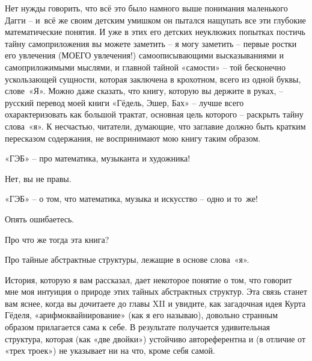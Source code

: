 \documentclass[../main.tex]{subfiles}
\begin{document}
Нет нужды говорить, что всё это было намного выше понимания маленького Дагги \--- и~всё же своим детским умишком он пытался нащупать все эти глубокие математические понятия. И уже в этих его детских неуклюжих попытках постичь тайну самоприложения вы можете заметить \--- я могу заметить \--- первые ростки его увлечения (МОЕГО увлечения!) самоописывающими высказываниями и самоприложимыми мыслями, и главной тайной «самости» \--- той бесконечно ускользающей сущности, которая заключена в крохотном, всего из одной буквы, слове~«Я». Можно даже сказать, что книгу, которую вы держите в руках, \--- русский перевод моей книги «Гёдель, Эшер, Бах» \--- лучше всего охарактеризовать как большой трактат, основная цель которого \--- раскрыть тайну слова~«я». К несчастью, читатели, думающие, что заглавие должно быть кратким пересказом содержания, не воспринимают мою книгу таким образом.

\begin{dialogue}
 «ГЭБ» \--- про математика, музыканта и художника!

 Нет, вы не правы.

 «ГЭБ» \--- о том, что математика, музыка и искусство \--- одно и то~же!

 Опять ошибаетесь.

 Про что же тогда эта книга?

 Про тайные абстрактные структуры, лежащие в основе слова~«я».
\end{dialogue}

История, которую я вам рассказал, дает некоторое понятие о том, что говорит мне моя интуиция о природе этих тайных абстрактных структур. Эта связь станет вам яснее, когда вы дочитаете до главы XII и увидите, как загадочная идея Курта Гёделя, «арифмоквайнирование» (как я его называю), довольно странным образом прилагается сама к себе. В результате получается удивительная структура, которая (как «две двойки») устойчиво автореферентна и (в отличие от «трех троек») не указывает ни на что, кроме себя самой.
\end{document}
